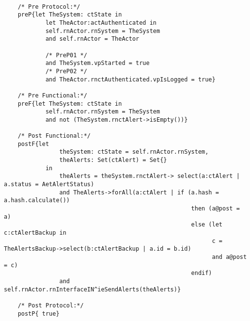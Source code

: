 	\scriptsize
	\vspace{0.5cm}
	\begin{lstlisting}[style=MessirStyle,firstnumber=auto,captionpos=b,caption={\msrmessir (MCL-oriented) specification of the operation \emph{oeGetAlertsSet}.},label=OM-actCoordinator-oeGetAlertsSet-MCL-LST]

	/* Pre Protocol:*/ 
	preP{let TheSystem: ctState in
	  		let TheActor:actAuthenticated in
	  		self.rnActor.rnSystem = TheSystem
	  		and self.rnActor = TheActor
	  
			/* PreP01 */
	  		and TheSystem.vpStarted = true
			/* PreP02 */
	  		and TheActor.rnctAuthenticated.vpIsLogged = true}
	
	/* Pre Functional:*/
	preF{let TheSystem: ctState in
			self.rnActor.rnSystem = TheSystem
			and not (TheSystem.rnctAlert->isEmpty())}
	
	/* Post Functional:*/ 
	postF{let 
				theSystem: ctState = self.rnActor.rnSystem,
				theAlerts: Set(ctAlert) = Set{}
			in
				theAlerts = theSystem.rnctAlert-> select(a:ctAlert | a.status = AetAlertStatus)
				and TheAlerts->forAll(a:ctAlert | if (a.hash = a.hash.calculate()) 
													  then (a@post = a) 
													  else (let c:ctAlertBackup in
															c = TheAlertsBackup->select(b:ctAlertBackup | a.id = b.id)
															and a@post = c) 
													  endif)
				and self.rnActor.rnInterfaceIN^ieSendAlerts(theAlerts)}
	
	/* Post Protocol:*/ 
	postP{ true}
	
	\end{lstlisting}
	\normalsize 
	
	
	
	





